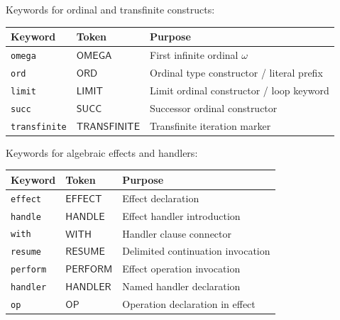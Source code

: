 \begin{definition}
\label{def:transfinite-keywords}
Keywords for ordinal and transfinite constructs:
\begin{center}
\begin{tabular}{lll}
\toprule
\textbf{Keyword} & \textbf{Token} & \textbf{Purpose} \\
\midrule
\texttt{omega} & $\mathsf{OMEGA}$ & First infinite ordinal $\omega$ \\
\texttt{ord} & $\mathsf{ORD}$ & Ordinal type constructor / literal prefix \\
\texttt{limit} & $\mathsf{LIMIT}$ & Limit ordinal constructor / loop keyword \\
\texttt{succ} & $\mathsf{SUCC}$ & Successor ordinal constructor \\
\texttt{transfinite} & $\mathsf{TRANSFINITE}$ & Transfinite iteration marker \\
\bottomrule
\end{tabular}
\end{center}
\end{definition}

\begin{definition}
\label{def:effect-keywords}
Keywords for algebraic effects and handlers:
\begin{center}
\begin{tabular}{lll}
\toprule
\textbf{Keyword} & \textbf{Token} & \textbf{Purpose} \\
\midrule
\texttt{effect} & $\mathsf{EFFECT}$ & Effect declaration \\
\texttt{handle} & $\mathsf{HANDLE}$ & Effect handler introduction \\
\texttt{with} & $\mathsf{WITH}$ & Handler clause connector \\
\texttt{resume} & $\mathsf{RESUME}$ & Delimited continuation invocation \\
\texttt{perform} & $\mathsf{PERFORM}$ & Effect operation invocation \\
\texttt{handler} & $\mathsf{HANDLER}$ & Named handler declaration \\
\texttt{op} & $\mathsf{OP}$ & Operation declaration in effect \\
\bottomrule
\end{tabular}
\end{center}
\end{definition}

